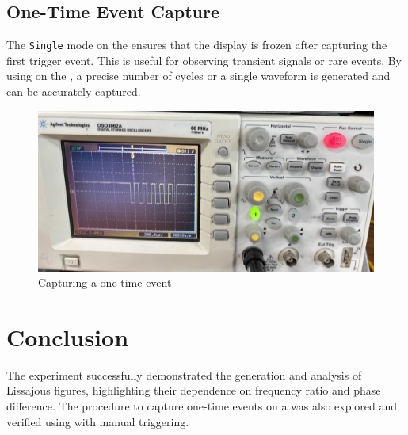 \documentclass[a4paper,12pt]{article}
\begin{document}
\subsection*{One-Time Event Capture}
The \texttt{Single} mode on the  ensures that the display is frozen after capturing the first trigger event. This is useful for observing transient signals or rare events. By using  on the , a precise number of cycles or a single waveform is generated and can be accurately captured.
\begin{figure}[h!]
   \centering
   \includegraphics[width=\columnwidth]{figs/one-time-event.jpeg}
   \caption{Capturing a one time event}
   \label{stemplot}
\end{figure}
\section*{Conclusion}
The experiment successfully demonstrated the generation and analysis of Lissajous figures, highlighting their dependence on frequency ratio and phase difference. The procedure to capture one-time events on a  was also explored and verified using  with manual triggering.
\end{document}

